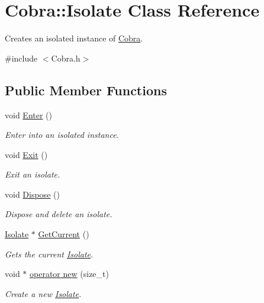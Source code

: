 \hypertarget{class_cobra_1_1_isolate}{\section{Cobra\+:\+:Isolate Class Reference}
\label{class_cobra_1_1_isolate}
}


Creates an isolated instance of \hyperlink{namespace_cobra}{Cobra}.  




{\ttfamily \#include $<$Cobra.\+h$>$}

\subsection*{Public Member Functions}
\begin{DoxyCompactItemize}
\item 
void \hyperlink{class_cobra_1_1_isolate_a4068d4a9823614e37cef8b6b83636e6f}{Enter} ()
\begin{DoxyCompactList}\small\item\em Enter into an isolated instance. \end{DoxyCompactList}\item 
void \hyperlink{class_cobra_1_1_isolate_ac71d0bdb49cbff292513ab2d19b722b0}{Exit} ()
\begin{DoxyCompactList}\small\item\em Exit an isolate. \end{DoxyCompactList}\item 
void \hyperlink{class_cobra_1_1_isolate_a82661d26d5141093293e28eb4d2c8417}{Dispose} ()
\begin{DoxyCompactList}\small\item\em Dispose and delete an isolate. \end{DoxyCompactList}\item 
\hyperlink{class_cobra_1_1_isolate}{Isolate} $\ast$ \hyperlink{class_cobra_1_1_isolate_a84c9d0a18342d395403ef9bec75e56e7}{Get\+Current} ()
\begin{DoxyCompactList}\small\item\em Gets the current \hyperlink{class_cobra_1_1_isolate}{Isolate}. \end{DoxyCompactList}\item 
void $\ast$ \hyperlink{class_cobra_1_1_isolate_a29b53dfacb699c647d8ae3db9cd799a9}{operator new} (size\+\_\+t)
\begin{DoxyCompactList}\small\item\em Create a new \hyperlink{class_cobra_1_1_isolate}{Isolate}. \end{DoxyCompactList}\end{DoxyCompactItemize}

